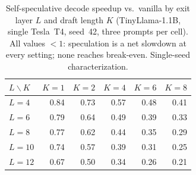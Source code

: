 \begin{table}[t]
\centering
\small
\caption{Self-speculative decode speedup vs.\ vanilla by exit layer $L$ and
draft length $K$ (TinyLlama-1.1B, single Tesla~T4, seed~42, three prompts per
cell). All values $<1$: speculation is a net slowdown at every setting; none
reaches break-even. Single-seed characterization.}
\label{tab:specbreakeven}
\begin{tabular}{lrrrrr}
\toprule
$L \backslash K$ & $K{=}1$ & $K{=}2$ & $K{=}4$ & $K{=}6$ & $K{=}8$ \\
\midrule
$L{=}4$  & 0.84 & 0.73 & 0.57 & 0.48 & 0.41 \\
$L{=}6$  & 0.79 & 0.64 & 0.49 & 0.39 & 0.33 \\
$L{=}8$  & 0.77 & 0.62 & 0.44 & 0.35 & 0.29 \\
$L{=}10$ & 0.74 & 0.57 & 0.39 & 0.31 & 0.25 \\
$L{=}12$ & 0.67 & 0.50 & 0.34 & 0.26 & 0.21 \\
\bottomrule
\end{tabular}
\end{table}
